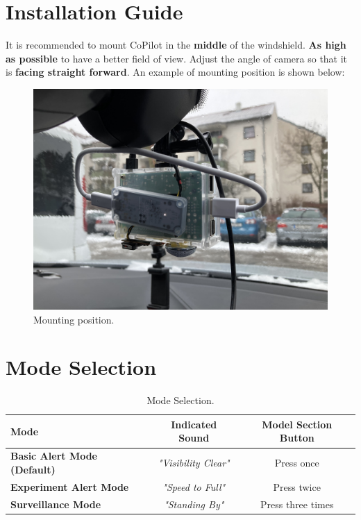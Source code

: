 \documentclass[a4paper]{manual}
\begin{document}
\section{Installation Guide}
It is recommended to mount CoPilot in the \textbf{middle} of the windshield. \textbf{As high as possible} to have a better field of view. Adjust the angle of camera so that it is \textbf{facing straight forward}.
An example of mounting position is shown below:

\begin{figure}[h!]
  \centering
  \includegraphics[width=.65\textwidth]{pics/interior}
  \caption[]{Mounting position.}
  \label{fig:front}
\end{figure}

\section{Mode Selection}


\begin{table}[h!]
\centering
\caption{\label{tab:mode}Mode Selection.}
\begin{tabular}{l|c|c}
\hline
    Mode & Indicated Sound & Model Section Button\\\hline
    \textbf{Basic Alert Mode (Default)}& \emph{"Visibility Clear"} & Press once \\\hline
    \textbf{Experiment Alert Mode} & \emph{"Speed to Full"} & Press twice \\\hline
    \textbf{Surveillance Mode} & \emph{"Standing By"} & Press three times \\\hline
\end{tabular}
\end{table}

\newcommand{\centered}[1]{\begin{tabular}{l} #1 \end{tabular}}
\end{document}
